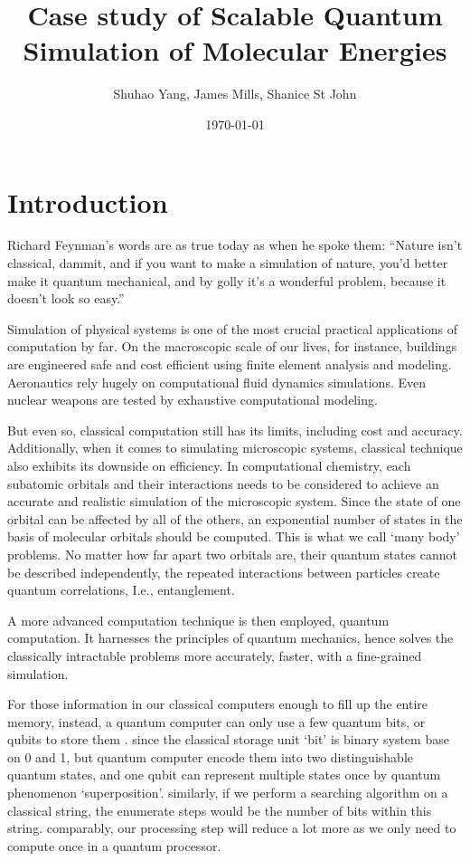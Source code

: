\documentclass[12pt]{article}
\begin{document}
\title{Case study of Scalable Quantum Simulation of Molecular Energies}
\author{Shuhao Yang, James Mills, Shanice St John}
\date{\today}
\maketitle
\section{Introduction}
Richard Feynman’s words are as true today as when he spoke them: “Nature isn't classical, dammit, and if you want to make a simulation of nature, you'd better make it quantum mechanical, and by golly it's a wonderful problem, because it doesn't look so easy.” 

Simulation of physical systems is one of the most crucial practical applications of computation by far.  On the macroscopic scale of our lives, for instance, buildings are engineered safe and cost efficient using ﬁnite element analysis and modeling. Aeronautics rely hugely on computational ﬂuid dynamics simulations. Even nuclear weapons are tested by exhaustive computational modeling.

But even so, classical computation still has its limits, including cost and accuracy. Additionally, when it comes to simulating microscopic systems, classical technique also exhibits its downside on efficiency. In computational chemistry, each subatomic orbitals and their interactions needs to be considered to achieve an accurate and realistic simulation of the microscopic system. Since the state of one orbital can be affected by all of the others, an exponential number of states in the basis of molecular orbitals should be computed. This is what we call ‘many body’ problems. No matter how far apart two orbitals are, their quantum states cannot be described independently, the repeated interactions between particles create quantum correlations, I.e., entanglement. 

A more advanced computation technique is then employed, quantum computation. It harnesses the principles of quantum mechanics, hence solves the classically intractable problems more accurately, faster, with a fine-grained simulation. 

For those information in our classical computers enough to fill up the entire memory, instead, a quantum computer can only use a few quantum bits, or qubits to store them \cite{trabesinger2012quantum}. since the classical storage unit ‘bit’ is binary system base on 0 and 1, but quantum computer encode them into two distinguishable quantum states, and one qubit can represent multiple states once by quantum phenomenon ‘superposition’. similarly, if we perform a searching algorithm on a classical string, the enumerate steps would be the number of bits within this string. comparably, our processing step will reduce a lot more as we only need to compute once in a quantum processor.
\end{document}
